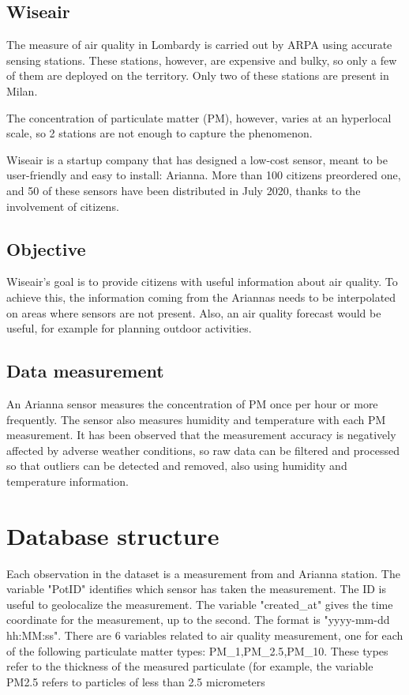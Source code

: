\documentclass{article}
\begin{document}
\subsection{Wiseair}

The measure of air quality in Lombardy is carried out by ARPA using accurate sensing stations. These stations, however, are expensive and bulky, so only a few of them are deployed on the territory. Only two of these stations are present in Milan. 

The concentration of particulate matter (PM), however, varies at an hyperlocal scale, so 2 stations are not enough to capture the phenomenon. 

Wiseair is a startup company that has designed a low-cost sensor, meant to be user-friendly and easy to install: Arianna. More than 100 citizens preordered one, and 50 of these sensors have been distributed in July 2020, thanks to the involvement of citizens.

\subsection{Objective}

Wiseair's goal is to provide citizens with useful information about air quality. To achieve this, the information coming from the Ariannas needs to be interpolated on areas where sensors are not present. Also, an air quality forecast would be useful, for example for planning outdoor activities. 

\subsection{Data measurement}

An Arianna sensor measures the concentration of PM once per hour or more frequently. The sensor also measures humidity and temperature with each PM measurement. It has been observed that the measurement accuracy is negatively affected by adverse weather conditions, so raw data can be filtered and processed so that outliers can be detected and removed, also using humidity and temperature information.

\section{Database structure}

Each observation in the dataset is a measurement from and Arianna station. 
The variable "PotID" identifies which sensor has taken the measurement. The ID is useful to geolocalize the measurement.
The variable "created\_at" gives the time coordinate for the measurement, up to the second. The format is "yyyy-mm-dd hh:MM:ss".
There are 6 variables related to air quality measurement, one for each of the following particulate matter types: PM_{1},PM_{2.5},PM_{10}. These types refer to the thickness of the measured particulate (for example, the variable PM{2.5} refers to particles of less than 2.5 micrometers
\end{document}
